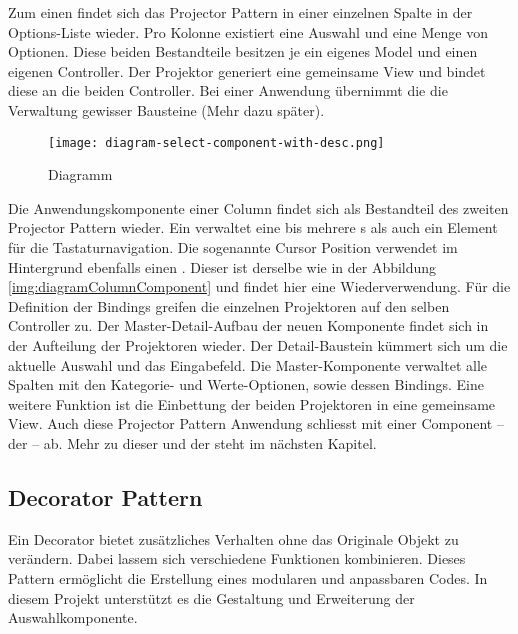 Zum einen findet sich das Projector Pattern in einer einzelnen Spalte in der Options-Liste wieder. 
Pro Kolonne existiert eine Auswahl und eine Menge von Optionen. 
Diese beiden Bestandteile besitzen je ein eigenes Model und einen eigenen Controller. 
Der Projektor generiert eine gemeinsame View und bindet diese an die beiden Controller. 
Bei einer Anwendung übernimmt die  die Verwaltung gewisser Bausteine (Mehr dazu später). 

\begin{figure}[!htb]
    \centering
    \texttt{[image: diagram-select-component-with-desc.png]}
    \caption{\centering Diagramm }
    \label{img:diagramSelectComponent}
\end{figure}

Die Anwendungskomponente einer Column findet sich als Bestandteil des zweiten Projector Pattern wieder. 
Ein  verwaltet eine bis mehrere s als auch ein Element für die Tastaturnavigation. 
Die sogenannte Cursor Position verwendet im Hintergrund ebenfalls einen . 
Dieser ist derselbe wie in der Abbildung \ref{img:diagramColumnComponent} und findet hier eine Wiederverwendung. 
Für die Definition der Bindings greifen die einzelnen Projektoren auf den selben Controller zu. 
Der Master-Detail-Aufbau der neuen Komponente findet sich in der Aufteilung der Projektoren wieder. 
Der Detail-Baustein kümmert sich um die aktuelle Auswahl und das Eingabefeld. 
Die Master-Komponente verwaltet alle Spalten mit den Kategorie- und Werte-Optionen, sowie dessen Bindings. 
Eine weitere Funktion ist die Einbettung der beiden Projektoren in eine gemeinsame View. 
Auch diese Projector Pattern Anwendung schliesst mit einer Component – der  – ab. 
Mehr zu dieser und der  steht im nächsten Kapitel. 


\subsection{Decorator Pattern}
\label{sec:decoratorPattern}

Ein Decorator bietet zusätzliches Verhalten ohne das Originale Objekt zu verändern. 
Dabei lassem sich verschiedene Funktionen kombinieren. 
Dieses Pattern ermöglicht die Erstellung eines modularen und anpassbaren Codes. 
In diesem Projekt unterstützt es die Gestaltung und Erweiterung der Auswahlkomponente. 

